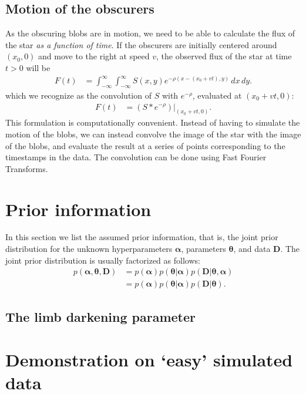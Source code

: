 \documentclass[a4paper,fleqn,usenatbib]{mnras}
\begin{document}
\subsection{Motion of the obscurers}
As the obscuring blobs are in motion, we need to be able to calculate the
flux of the star {\em as a function of time}. If the obscurers
are initially centered around $(x_0, 0)$ and move to the right
at speed $v$, the observed flux of the star at time $t > 0$ will be
\begin{align}
F(t) &= \int_{-\infty}^{\infty}\int_{-\infty}^{\infty}
          S(x, y)e^{-\rho\left(x - (x_0 + vt), y\right)} \, dx \, dy.
\end{align}
which we recognize as the convolution of $S$ with $e^{-\rho}$, evaluated
at $(x_0 + vt, 0)$:
\begin{align}
F(t) &= \left.\left(S * e^{-\rho}\right)\right|_{(x_0 + vt, 0)}.
\end{align}
This formulation is computationally convenient. Instead of having to
simulate the motion of the blobs, we can instead convolve the image of
the star with the image of the blobs, and evaluate the result at a series
of points corresponding to the timestamps in the data.
The convolution can be done using Fast Fourier Transforms.

\section{Prior information}
In this section we list the assumed prior information, that is,
the joint prior distribution for the unknown hyperparameters
$\boldsymbol{\alpha}$, parameters $\boldsymbol{\theta}$,
and data $\boldsymbol{D}$. The joint prior distribution is usually factorized
as follows:
\begin{align}
p(\boldsymbol{\alpha}, \boldsymbol{\theta}, \boldsymbol{D})
    &= p(\boldsymbol{\alpha})p(\boldsymbol{\theta}|\boldsymbol{\alpha})
        p(\boldsymbol{D} | \boldsymbol{\theta}, \boldsymbol{\alpha})\\
    &= p(\boldsymbol{\alpha})p(\boldsymbol{\theta}|\boldsymbol{\alpha})
        p(\boldsymbol{D} | \boldsymbol{\theta}).
\end{align}

\subsection{The limb darkening parameter}



\section{Demonstration on `easy' simulated data}
\end{document}
